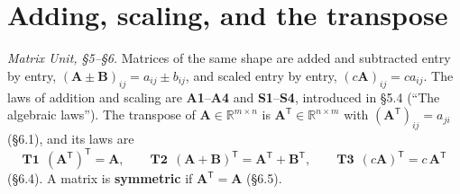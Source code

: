 \documentclass[11pt]{article}
\newcommand{\R}{\mathbb{R}}
\newcommand{\mt}[1]{\mathbf{#1}}          %
\newcommand{\T}{^{\mathsf{T}}}            %
\begin{document}
\section{Adding, scaling, and the transpose}
\emph{Matrix Unit, \S5--\S6.} Matrices of the same shape are added and
subtracted entry by entry, $(\mt{A}\pm\mt{B})_{ij}=a_{ij}\pm b_{ij}$, and
scaled entry by entry, $(c\mt{A})_{ij}=ca_{ij}$. The laws of addition and
scaling are \textbf{A1}--\textbf{A4} and \textbf{S1}--\textbf{S4}, introduced in
\S5.4 (``The algebraic laws''). The transpose of $\mt{A}\in\R^{m\times n}$ is
$\mt{A}\T\in\R^{n\times m}$ with $(\mt{A}\T)_{ij}=a_{ji}$ (\S6.1), and its laws
are
\[
  \textbf{T1}\ \ (\mt{A}\T)\T=\mt{A},
  \qquad
  \textbf{T2}\ \ (\mt{A}+\mt{B})\T=\mt{A}\T+\mt{B}\T,
  \qquad
  \textbf{T3}\ \ (c\mt{A})\T=c\,\mt{A}\T
\]
(\S6.4). A matrix is \textbf{symmetric} if $\mt{A}\T=\mt{A}$ (\S6.5).
\end{document}
